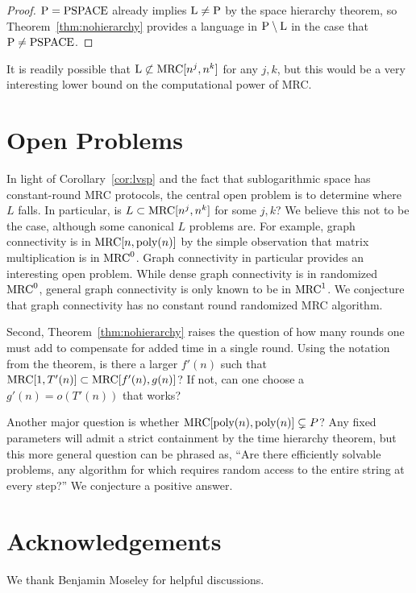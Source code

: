 \documentclass[11pt]{article}
\theoremstyle{definition}
\theoremstyle{remark}
\newcommand{\mrc}{\textup{MRC}}
\renewcommand{\P}{\textup{P}}
\renewcommand{\L}{\textup{L}}
\newcommand{\PSPACE}{\textup{PSPACE}}
\begin{document}
\begin{proof}
$\P = \PSPACE$ already implies $\L \neq \P$ by the space hierarchy theorem, so
Theorem~\ref{thm:nohierarchy} provides a language in $\P \setminus \L$ in the
case that $\P \neq \PSPACE$.  
\end{proof}

It is readily possible that $\L \not \subset \mrc[n^j, n^k]$ for any $j,k$, but
this would be a very interesting lower bound on the computational power of MRC.

\section{Open Problems}\label{sec:openproblems}

In light of Corollary~\ref{cor:lvsp} and the fact that sublogarithmic space has
constant-round MRC protocols, the central open problem is to determine where
$L$ falls. In particular, is $L \subset \mrc[n^j, n^k]$ for some $j, k$? We
believe this not to be the case, although some canonical $L$ problems are. For
example, graph connectivity is in $\mrc[n, \text{poly}(n)]$ by the simple
observation that matrix multiplication is in $\mrc^0$. Graph connectivity in
particular provides an interesting open problem. While dense graph connectivity
is in randomized $\mrc^0$, general graph connectivity is only known to be in
$\mrc^1$. We conjecture that graph connectivity has no constant round
randomized MRC algorithm. 

Second, Theorem~\ref{thm:nohierarchy} raises the question of how many rounds
one must add to compensate for added time in a single round. Using the notation
from the theorem, is there a larger $f'(n)$ such that $\mrc[1, T'(n)] \subset
\mrc[f'(n), g(n)]$? If not, can one choose a $g'(n) = o(T'(n))$ that works?

Another major question is whether $\mrc[\text{poly}(n), \text{poly}(n)]
\subsetneq P$? Any fixed parameters will admit a strict containment by the time
hierarchy theorem, but this more general question can be phrased as, ``Are
there efficiently solvable problems, any algorithm for which requires random
access to the entire string at every step?'' We conjecture a positive answer.
 
\section*{Acknowledgements}
We thank Benjamin Moseley for helpful discussions.




\end{document}
